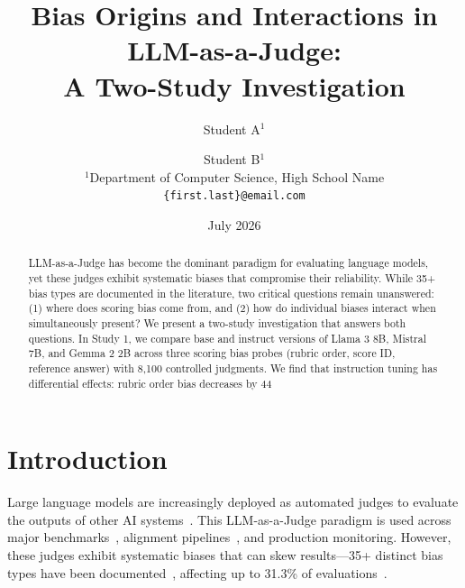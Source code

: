 \documentclass[11pt,twocolumn]{article}
\title{Bias Origins and Interactions in LLM-as-a-Judge:\\A Two-Study Investigation}
\author{Student A$^{1}$ \and Student B$^{1}$ \\
$^{1}$Department of Computer Science, High School Name \\
\texttt{\{first.last\}@email.com}}
\date{July 2026}
\begin{document}
\maketitle

\begin{abstract}
LLM-as-a-Judge has become the dominant paradigm for evaluating language models, yet these judges exhibit systematic biases that compromise their reliability. While 35+ bias types are documented in the literature, two critical questions remain unanswered: (1) where does scoring bias come from, and (2) how do individual biases interact when simultaneously present? We present a two-study investigation that answers both questions. In Study 1, we compare base and instruct versions of Llama 3 8B, Mistral 7B, and Gemma 2 2B across three scoring bias probes (rubric order, score ID, reference answer) with 8,100 controlled judgments. We find that instruction tuning has differential effects: rubric order bias decreases by 44%
\end{abstract}

\section{Introduction}

Large language models are increasingly deployed as automated judges to evaluate the outputs of other AI systems~\cite{zheng2023judging,gu2024survey}. This LLM-as-a-Judge paradigm is used across major benchmarks~\cite{li2025scoring,yang2025reliable}, alignment pipelines~\cite{bai2022constitutional}, and production monitoring. However, these judges exhibit systematic biases that can skew results---35+ distinct bias types have been documented~\cite{ye2024justice,park2024offsetbias}, affecting up to 31.3\% of evaluations~\cite{yang2025reliable}.
\end{document}
